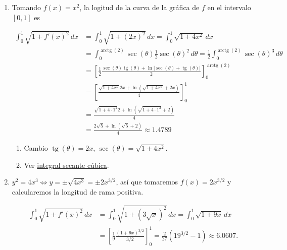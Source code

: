\documentclass[
  spanish,
  a4paper,
]{scrreport}
\providecommand{\tightlist}{%
  \setlength{\itemsep}{0pt}\setlength{\parskip}{0pt}}
\theoremstyle{definition}
\theoremstyle{remark}
\begin{document}
\begin{tcolorbox}[enhanced jigsaw, arc=.35mm, bottomrule=.15mm, bottomtitle=1mm, breakable, colback=white, colbacktitle=quarto-callout-tip-color!10!white, colframe=quarto-callout-tip-color-frame, coltitle=black, left=2mm, leftrule=.75mm, opacityback=0, opacitybacktitle=0.6, rightrule=.15mm, title=\textcolor{quarto-callout-tip-color}{\faLightbulb}\hspace{0.5em}{Solución}, titlerule=0mm, toprule=.15mm, toptitle=1mm]

\begin{enumerate}
\def\labelenumi{\alph{enumi}.}
\item
  Tomando \(f(x)=x^2\), la logitud de la curva de la gráfica de \(f\) en
  el intervalo \([0,1]\) es

  \begin{align*}
  \int_0^1 \sqrt{1+f'(x)^2}\,dx 
  &= \int_0^1 \sqrt{1+(2x)^2}\, dx
  = \int_0^1 \sqrt{1+4x^2}\,dx \\
  &= \int_0^{\operatorname{arctg}(2)} \sec(\theta)\frac{1}{2}\sec(\theta)^2\,d\theta 
  = \frac{1}{2}\int_0^{\operatorname{arctg}(2)} \sec(\theta)^3\,d\theta \tag{1} \\ 
  &= \left[\frac{1}{2} \frac{\sec(\theta)\operatorname{tg}(\theta)+\ln|\sec(\theta)+\operatorname{tg}(\theta)|}{2}\right]_0^{\operatorname{arctg}(2)} \tag{2}\\
  &= \left[\frac{\sqrt{1+4x^2} 2x+\ln(\sqrt{1+4x^2}+2x)}{4}\right]_0^1 \tag{Deshacer 1}\\
  &= \frac{\sqrt{1+4\cdot 1^2} 2+\ln(\sqrt{1+4\cdot 1^2}+2)}{4} \\
  &= \frac{2\sqrt{5}+\ln(\sqrt{5}+2)}{4}
  \approx 1.4789  
  \end{align*}

  \begin{enumerate}
  \def\labelenumii{(\arabic{enumii})}
  \tightlist
  \item
    Cambio \(\operatorname{tg}(\theta)=2x\),
    \(\sec(\theta)=\sqrt{1+4x^2}\).\\
  \item
    Ver
    \href{https://es.wikipedia.org/wiki/Integral_de_la_secante_c\%C3\%BAbica}{integral
    secante cúbica}.
  \end{enumerate}
\item
  \(y^2=4x^3 \Leftrightarrow y=\pm\sqrt{4x^3} = \pm 2x^{3/2}\), así que
  tomaremos \(f(x)=2x^{3/2}\) y calcularemos la longitud de rama
  positiva.

  \begin{align*}
  \int_0^1 \sqrt{1+f'(x)^2}\,dx 
  &= \int_0^1 \sqrt{1+(3\sqrt{x})^2}\, dx 
  = \int_0^1 \sqrt{1+9x}\,dx \\
  &=\left[\frac{1}{9}\frac{(1+9x)^{3/2}}{3/2}\right]_0^1
  = \frac{2}{27}(19^{3/2}-1)
  \approx 6.0607.
  \end{align*}


\end{enumerate}
\end{tcolorbox}
\end{document}
